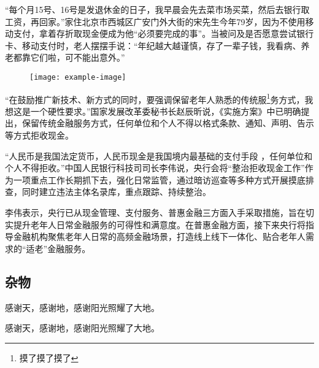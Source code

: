 \documentclass[printMode]{ecnuthesis}
\begin{document}
“每个月15号、16号是发退休金的日子，我早晨会先去菜市场买菜，然后去银行取工资，再回家。”家住北京市西城区广安门外大街的宋先生今年79岁，因为不使用移动支付，拿着存折取现金便成为他“必须要完成的事”。当被问及是否愿意尝试银行卡、移动支付时，老人摆摆手说：“年纪越大越谨慎，存了一辈子钱，我看病、养老都靠它们啦，可不能出意外。”

\begin{figure}
    \centering
    \texttt{[image: example-image]}
  \end{figure}

“在鼓励推广新技术、新方式的同时，要强调保留老年人熟悉的传统服\footnote{摸了摸了摸了}务方式，我想这是一个硬性要求。”国家发展改革委秘书长赵辰昕说，《实施方案》中已明确提出，保留传统金融服务方式，任何单位和个人不得以格式条款、通知、声明、告示等方式拒收现金。

“人民币是我国法定货币，人民币现金是我国境内最基础的支付手段 \cite{Yang_Hy200215} ，任何单位和个人不得拒收。”中国人民银行科技司司长李伟说，央行会将“整治拒收现金工作”作为一项重点工作长期抓下去，强化日常监管，通过暗访巡查等多种方式开展摸底排查，同时建立违法主体名录库，重点跟踪、持续整治。

李伟表示，央行已从现金管理、支付服务、普惠金融三方面入手采取措施，旨在切实提升老年人日常金融服务的可得性和满意度。在普惠金融方面，接下来央行将指导金融机构聚焦老年人日常的高频金融场景，打造线上线下一体化、贴合老年人需求的“适老”金融服务。

\backmatter
\PrintReference

\begin{appendix}
  \chapter{杂物}
  感谢天，感谢地，感谢阳光照耀了大地。
\end{appendix}

\begin{acknowledgement}
  感谢天，感谢地，感谢阳光照耀了大地。
\end{acknowledgement}
\end{document}
